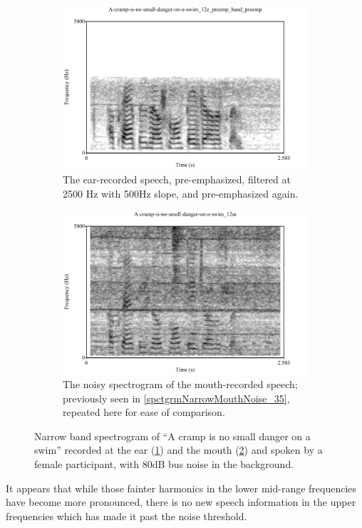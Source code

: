 \documentclass[dissertation,copyright]{uathesis}
\begin{document}
\begin{figure}[b!]
\centering
\begin{subfigure}{0.475\textwidth}
  \centering
  \includegraphics[width=1\linewidth]{figure/spctgrmNarrowEarNoisePrempFiltPremp.pdf}
  \caption{The ear-recorded speech, pre-emphasized, filtered at 2500 Hz with 500Hz slope, and pre-emphasized again.}
  \label{spctgrmNarrowEarNoisePrempFiltPremp_35}
\end{subfigure}%
\hfill
\begin{subfigure}{0.475\textwidth}
  \centering
  \includegraphics[width=1\linewidth]{figure/spctgrmNarrowMthNoise_35.pdf}
  \caption{The noisy spectrogram of the mouth-recorded speech; previously seen in \ref{spctgrmNarrowMouthNoise_35}, repeated here for ease of comparison.}
  \label{spctgrmNarrowMouthNoise_35_compare}
\end{subfigure}
\caption{Narrow band spectrogram of ``A cramp is no small danger on a swim'' recorded at the ear (\ref{spctgrmNarrowEarNoisePrempFiltPremp_35}) and the mouth (\ref{spctgrmNarrowMouthNoise_35_compare}) and spoken by a female participant, with 80dB bus noise in the background.}
\label{fig:ear_pfp}
\end{figure}
It appears that while those fainter harmonics in the lower mid-range frequencies have become more pronounced, there is no new speech information in the upper frequencies which has made it past the noise threshold.
\end{document}
